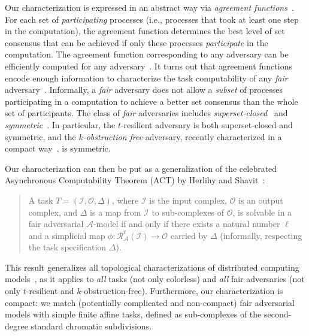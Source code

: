 \documentclass[a4paper]{article}
\newcommand{\myparagraph}[1]{\vspace{6pt}\noindent \textbf{#1}}
\def\A{\ensuremath{\mathcal{A}}}
\def\R{\ensuremath{\mathcal{R}}}
\def\I{\ensuremath{\mathcal{I}}}
\def\O{\ensuremath{\mathcal{O}}}
\def\fair{\textit{fair}}
\newcommand{\remove}[1]{}
\def\O {\mathcal{O}}
\def\I {\mathcal{I}}
\begin{document}
%
Our characterization is expressed in an abstract way via
\emph{agreement functions}~\cite{KR17}.
%
For each set of \emph{participating} processes (i.e., processes that
took at least one step in the
computation), the agreement function determines the best level of set
consensus that can be achieved if only these processes \emph{participate} in
the computation.
%
The agreement function corresponding to any adversary can be efficiently computed for
any adversary~\cite{GK10,KR17}.
It turns out that agreement functions encode enough information to
characterize the task computability of any {\fair}
adversary~\cite{KR17}.
%
Informally, a {\fair} adversary does not allow a \emph{subset} of
processes participating in a computation to achieve a better 
set consensus than the whole set of participants.
%
%
The class of {\fair} adversaries includes \emph{superset-closed}~\cite{Kuz12}
and \emph{symmetric}~\cite{Tau10}.
%
In particular, the $t$-resilient adversary is both superset-closed and
symmetric, and the \emph{$k$-obstruction free} adversary, recently
characterized in a compact way~\cite{GHKR16}, is symmetric.  

\remove{
Symmetric adversaries (or \emph{symmetric progress
  conditions} introduced by Taubenfeld. 
%
A symmetric adversary does not depend on process identifiers: if
$S\in\A$, then for every set of processes $S'$ such that $|S'|=|S|$,
we have $S'\in\A$.
%
Thus, an $n$-process symmetric adversary can be defined
as a set $L$ of ``levels'' in
$\{1,\ldots,n\}$ so that a set of processes is a live set if and only
if its size is in $L$.
%
For example, the \emph{$k$-obstruction free} adversary, recently
characterized in an affine way in~\cite{GHKR16}, consists of all
sets of  sizes from $1$ to $k$.
}

Our characterization can then be put as a generalization of the
celebrated Asynchronous Computability Theorem (ACT) by Herlihy and Shavit~\cite{HS99}:
\begin{quote}
A task $T=(\I,\O,\Delta)$, where $\I$ is the input complex, $\O$ is an
output complex, and $\Delta$ is a map from $\I$ to sub-complexes of
$\O$, is solvable in a fair adversarial $\A$-model
if and only if there exists a natural number $\ell$ and a simplicial map
$\phi: \R_{\A}^{\ell}(\I) \rightarrow \O$ carried by $\Delta$
(informally, respecting the task specification $\Delta$).
\end{quote}

This result generalizes all topological characterizations of
distributed computing models~\cite{HS99,GKM14-podc,GHKR16,SHG16},
as it applies to \emph{all} tasks (not only colorless)
and \emph{all} fair adversaries (not only
$t$-resilient and $k$-obstruction-free).
Furthermore, our characterization is compact: we match (potentially complicated and non-compact)
fair adversarial models with simple finite affine tasks, defined as 
sub-complexes of the second-degree standard chromatic subdivisions.
\end{document}
